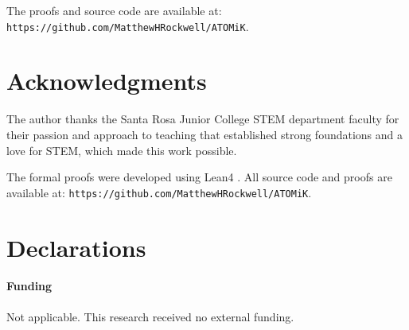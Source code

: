 \documentclass[11pt,letterpaper]{article}
\theoremstyle{plain}
\theoremstyle{definition}
\theoremstyle{remark}
\begin{document}
The proofs and source code are available at: \texttt{https://github.com/MatthewHRockwell/ATOMiK}.

\section*{Acknowledgments}

The author thanks the Santa Rosa Junior College STEM department faculty for their passion and approach to teaching that established strong foundations and a love for STEM, which made this work possible.

The formal proofs were developed using Lean4 \cite{moura2021lean4}. All source code and proofs are available at: \texttt{https://github.com/MatthewHRockwell/ATOMiK}.

\section*{Declarations}

\paragraph{Funding} Not applicable. This research received no external funding.



\end{document}
